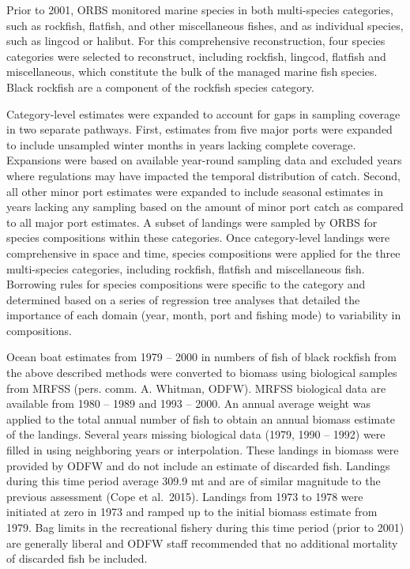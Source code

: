 \documentclass[11pt,
  english,
  letterpaper,
]{article}
\begin{document}
Prior to 2001, ORBS monitored marine species in both multi-species categories, such as rockfish, flatfish, and other miscellaneous fishes, and as individual species, such as lingcod or halibut. For this comprehensive reconstruction, four species categories were selected to reconstruct, including rockfish, lingcod, flatfish and miscellaneous, which constitute the bulk of the managed marine fish species. Black rockfish are a component of the rockfish species category.

Category-level estimates were expanded to account for gaps in sampling coverage in two separate pathways. First, estimates from five major ports were expanded to include unsampled winter months in years lacking complete coverage. Expansions were based on available year-round sampling data and excluded years where regulations may have impacted the temporal distribution of catch. Second, all other minor port estimates were expanded to include seasonal estimates in years lacking any sampling based on the amount of minor port catch as compared to all major port estimates. A subset of landings were sampled by ORBS for species compositions within these categories. Once category-level landings were comprehensive in space and time, species compositions were applied for the three multi-species categories, including rockfish, flatfish and miscellaneous fish. Borrowing rules for species compositions were specific to the category and determined based on a series of regression tree analyses that detailed the importance of each domain (year, month, port and fishing mode) to variability in compositions.

Ocean boat estimates from 1979 -- 2000 in numbers of fish of black rockfish from the above described methods were converted to biomass using biological samples from MRFSS (pers. comm. A. Whitman, ODFW). MRFSS biological data are available from 1980 -- 1989 and 1993 -- 2000. An annual average weight was applied to the total annual number of fish to obtain an annual biomass estimate of the landings. Several years missing biological data (1979, 1990 -- 1992) were filled in using neighboring years or interpolation. These landings in biomass were provided by ODFW and do not include an estimate of discarded fish. Landings during this time period average 309.9 mt and are of similar magnitude to the previous assessment (Cope et al.~2015). Landings from 1973 to 1978 were initiated at zero in 1973 and ramped up to the initial biomass estimate from 1979. Bag limits in the recreational fishery during this time period (prior to 2001) are generally liberal and ODFW staff recommended that no additional mortality of discarded fish be included.
\end{document}
